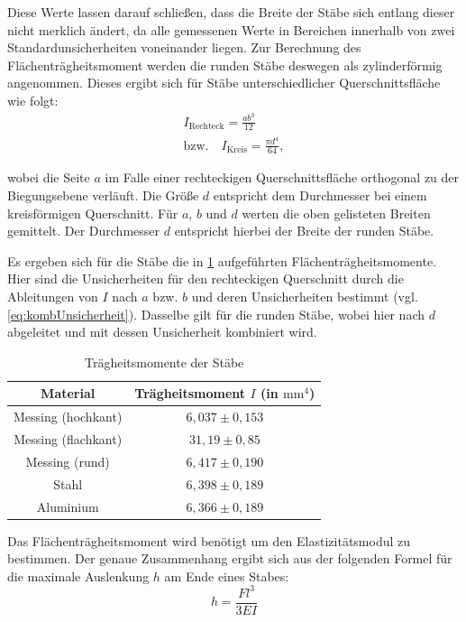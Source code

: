 \documentclass[11pt,a4paper,titlepage, ngerman]{article}
\begin{document}
		Diese Werte lassen darauf schließen, dass die Breite der Stäbe sich entlang dieser nicht merklich ändert, da alle gemessenen Werte in Bereichen innerhalb von zwei Standardunsicherheiten voneinander liegen.
		Zur Berechnung des Flächenträgheitsmoment werden die runden Stäbe deswegen als zylinderförmig angenommen.
		Dieses ergibt sich für Stäbe unterschiedlicher Querschnittsfläche wie folgt:
		\begin{align*}
			I_\text{Rechteck} = \frac{ab^3}{12} \\
			\text{bzw.} \quad I_\text{Kreis} =\frac{\pi d^4}{64}, 
		\end{align*}
		
		wobei die Seite $a$ im Falle einer rechteckigen Querschnittsfläche orthogonal zu der Biegungsebene verläuft. Die Größe $d$ entspricht dem Durchmesser bei einem kreisförmigen Querschnitt. Für $a$, $b$ und $d$ werten die oben gelisteten Breiten gemittelt. Der Durchmesser $d$ entspricht hierbei der Breite der runden Stäbe.
		
		Es ergeben sich für die Stäbe die in \cref{tab:Trägheitsmomente} aufgeführten Flächenträgheitsmomente. Hier sind die Unsicherheiten für den rechteckigen Querschnitt durch die Ableitungen von $I$ nach $a$ bzw. $b$ und deren Unsicherheiten bestimmt (vgl. \cref{eq:kombUnsicherheit}). Dasselbe gilt für die runden Stäbe, wobei hier nach $d$ abgeleitet und mit dessen Unsicherheit kombiniert wird.
		\begin{table}[ht]
			\caption{Trägheitsmomente der Stäbe}
			\centering
			\label{tab:Trägheitsmomente}
			\begin{tabular}{c|c}
				{Material} & {Trägheitsmoment $I$ (in $\text{mm}^4$)}\\ %
				\hline
				{Messing (hochkant)} & {$6,037\pm 0,153$}\\
				{Messing (flachkant)} & {$31,19\pm 0,85$}\\
				{Messing (rund)} & {$6,417\pm 0,190$}\\
				{Stahl} & {$6,398\pm 0,189$} \\
				{Aluminium} & {$6,366\pm 0,189$}\\	
			\end{tabular}
		\end{table}
		Das Flächenträgheitsmoment wird benötigt um den Elastizitätsmodul zu bestimmen. Der genaue Zusammenhang ergibt sich aus der folgenden Formel für die maximale Auslenkung $h$ am Ende eines Stabes:
		\begin{equation}
			h = \frac{Fl^3}{3EI} 
		\end{equation}
		
\end{document}
